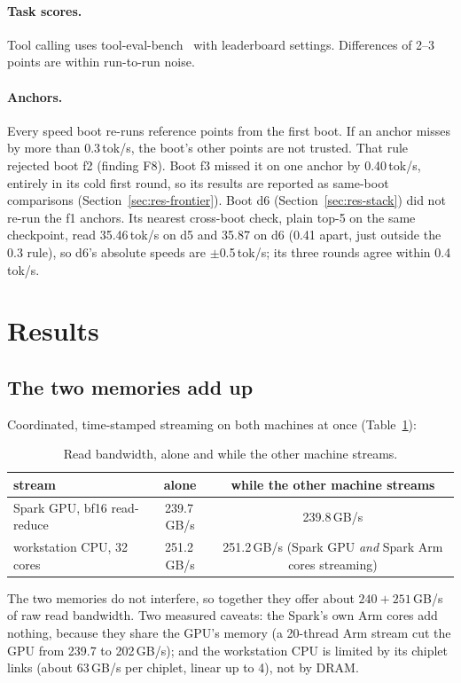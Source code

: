 \documentclass[11pt]{article}
\newcommand{\tps}{\,tok/s}
\begin{document}
\paragraph{Task scores.} Tool calling uses tool-eval-bench~\citep{tooleval} with leaderboard settings. Differences of 2--3
points are within run-to-run noise.

\paragraph{Anchors.} Every speed boot re-runs reference points from the first boot. If an anchor misses by more than
0.3\tps, the boot's other points are not trusted. That rule rejected boot f2 (finding F8). Boot f3 missed it on one
anchor by 0.40\tps, entirely in its cold first round, so its results are reported as same-boot comparisons
(Section~\ref{sec:res-frontier}). Boot d6 (Section~\ref{sec:res-stack}) did not re-run the f1 anchors. Its nearest
cross-boot check, plain top-5 on the same checkpoint, read 35.46\tps{} on d5 and 35.87 on d6 (0.41 apart, just outside
the 0.3 rule), so d6's absolute speeds are $\pm$0.5\tps; its three rounds agree within 0.4\tps.

\section{Results}
\label{sec:results}

\FloatBarrier
\subsection{The two memories add up}
\label{sec:res-mem}
Coordinated, time-stamped streaming on both machines at once (Table~\ref{tab:bw}):

\begin{table}[h]
\centering\small
\caption{Read bandwidth, alone and while the other machine streams.}
\label{tab:bw}
\begin{tabular}{lcc}
\toprule
stream & alone & while the other machine streams \\
\midrule
Spark GPU, bf16 read-reduce & 239.7\,GB/s & 239.8\,GB/s \\
workstation CPU, 32 cores & 251.2\,GB/s & 251.2\,GB/s (Spark GPU \emph{and} Spark Arm cores streaming) \\
\bottomrule
\end{tabular}
\end{table}

The two memories do not interfere, so together they offer about $240 + 251$\,GB/s of raw read bandwidth. Two measured
caveats: the Spark's own Arm cores add nothing, because they share the GPU's memory (a 20-thread Arm stream cut the GPU
from 239.7 to 202\,GB/s); and the workstation CPU is limited by its chiplet links (about 63\,GB/s per chiplet, linear up
to 4), not by DRAM.
\end{document}
